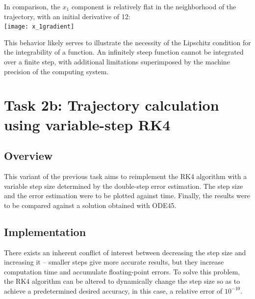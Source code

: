 \documentclass{article}
\begin{document}
	In comparison, the $x_1$ component is relatively flat in the
	neighborhood of the trajectory, with an initial derivative of 12:\\
	\texttt{[image: x\_1gradient]}
	
	This behavior likely serves to illustrate the necessity of the Lipschitz
	condition for the integrability of a function. An infinitely steep
	function cannot be integrated over a finite step, with additional
	limitations superimposed by the machine precision of the computing
	system.
	
	\newpage
	\section{Task 2b: Trajectory calculation using variable-step RK4}
	
	\subsection{Overview}
	
	This variant of the previous task aims to reimplement the RK4 algorithm
	with a variable step size determined by the double-step error
	estimation. The step size and the error estimation were to be plotted
	against time. Finally, the results were to be compared against a
	solution obtained with ODE45.
	
	\subsection{Implementation}
	
	There exists an inherent conflict of interest between decreasing the
	step size and increasing it -- smaller steps give more accurate results,
	but they increase computation time and accumulate floating-point errors.
	To solve this problem, the RK4 algorithm can be altered to dynamically
	change the step size so as to achieve a predetermined desired accuracy,
	in this case, a relative error of $10^{-10}$.
	
\end{document}

